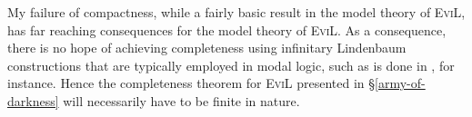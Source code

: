 My failure of compactness, while a fairly basic result in the model
theory of \textsc{EviL}, has far reaching consequences for the model
theory of \textsc{EviL}.  As a consequence, there is
no hope of achieving completeness using infinitary Lindenbaum
constructions that are typically employed in modal logic, such as is
done in \citep[][chapter 4]{blackburn_modal_2001}, for instance.
Hence the completeness theorem for \textsc{EviL} presented in \S\ref{army-of-darkness}
will necessarily have to be finite in nature.
